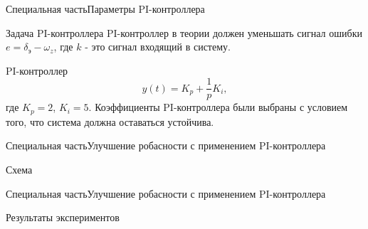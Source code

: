 
\begin{frame}{Специальная часть}{Параметры PI-контроллера}
    \begin{block}{Задача PI-контроллера}
        PI-контроллер в теории должен уменьшать сигнал ошибки $e =\delta_\text{э} - \omega_z$, где $k$ - это сигнал входящий в систему.
    \end{block}
    \begin{block}{PI-контроллер}
        $$y(t) = K_p + \frac{1}{p}K_i,$$
        где $K_p = 2$, $K_i = 5$.
        Коэффициенты PI-контроллера были выбраны с условием того, что система должна оставаться устойчива.     
    \end{block}
\end{frame}

\begin{frame}{Специальная часть}{Улучшение робасности с применением PI-контроллера}
    \begin{block}{Схема}
    \end{block}
\end{frame}

\begin{frame}{Специальная часть}{Улучшение робасности с применением PI-контроллера}
    \begin{block}{Результаты экспериментов}
    \end{block}
\end{frame}


